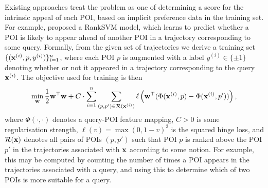 
Existing approaches treat the problem as one of determining a score for the intrinsic appeal of each POI,
based on implicit preference data in the training set.
For example, \citep{cikm16paper} proposed a RankSVM model,
which %
learns to predict whether a POI is likely to appear ahead of another POI in a trajectory corresponding to some query.
Formally,
from the given set of trajectories
we derive a training set $\{ ( \mathbf{x}^{(i)}, p, y^{(i)} ) \}_{i = 1}^n$,
where each POI $p$ is augmented with a label $y^{(i)} \in \{ \pm 1 \}$ denoting whether or not it appeared in a trajectory corresponding to the query $\mathbf{x}^{(i)}$. 
The objective used for training is then
\begin{equation*}
\displaystyle \min_{\mathbf{w}} \frac{1}{2} \mathbf{w}^\top \mathbf{w} + C \cdot \sum_{i = 1}^n \sum_{(p, p') \in \mathcal{R}( \mathbf{x}^{(i)} )} 
\ell\left( \mathbf{w}^\top ( \Phi( \mathbf{x}^{(i)}, p ) - \Phi( \mathbf{x}^{(i)}, p' ) ) \right),
\end{equation*}
where
$\Phi( \cdot, \cdot )$ denotes a query-POI feature mapping,
$C > 0$ is some regularisation strength,
$\ell( v ) = \max( 0, 1 - v )^2$ is the squared hinge loss,
and
$\mathcal{R}( \mathbf{x} )$
denotes all pairs of POIs $(p, p')$ such that
POI $p$ is ranked above the POI $p'$ in the trajectories associated with $\mathbf{x}$ according to some notion.
For example, this may be computed by counting the number of times a POI appears in the trajectories associated with a query, 
and using this to determine which of two POIs is more suitable for a query.

